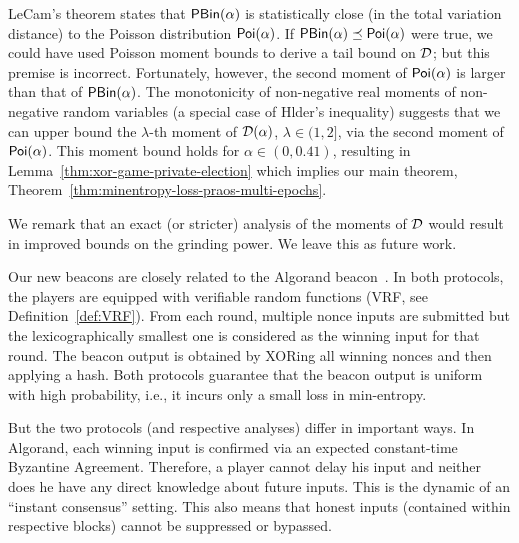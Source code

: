     LeCam's theorem states that $\mathsf{PBin}(\alpha)$ is 
    statistically close (in the total variation distance) 
    to the Poisson distribution $\mathsf{Poi}(\alpha)$. 
    If $\mathsf{PBin}(\alpha) \preceq \mathsf{Poi}(\alpha)$ were true, 
    we could have used Poisson moment bounds to 
    derive a tail bound on $\mathcal{D}$; 
    but this premise is incorrect. 
    Fortunately, however, 
    the second moment of $\mathsf{Poi}(\alpha)$ 
    is larger than that of $\mathsf{PBin}(\alpha)$.
    The monotonicity of non-negative real moments 
    of non-negative random variables
    (a special case of Hlder's inequality) 
    suggests that 
    we can upper bound the $\lambda$-th moment of $\mathcal{D}(\alpha)$, 
    $\lambda \in (1,2]$, via the second moment of $\mathsf{Poi}(\alpha)$. 
    This moment bound holds for $\alpha \in (0, 0.41)$, 
    resulting in Lemma~\ref{thm:xor-game-private-election} 
    which implies our main theorem, 
    Theorem~\ref{thm:minentropy-loss-praos-multi-epochs}.


    We remark that an exact (or stricter) analysis of 
    the moments of $\mathcal{D}$ 
    would result in improved bounds on the grinding power. 
    We leave this as future work.



        Our new beacons are closely related to the Algorand beacon~\cite{Algorand}. 
        In both protocols, 
        the players are equipped with verifiable
        random functions (VRF, see Definition~\ref{def:VRF}). 
        From each round, multiple nonce inputs are submitted 
        but the lexicographically smallest one is considered as the winning input for that round.
        The beacon output is obtained by XORing all winning nonces and then applying a hash. 
        Both protocols guarantee that the beacon output 
        is uniform with high probability, i.e., 
        it incurs only a small loss in min-entropy. 

        But the two protocols (and respective analyses) differ in important ways. 
        In Algorand, each winning input is confirmed via 
        an expected constant-time Byzantine Agreement. 
        Therefore, 
        a player cannot delay his input and neither does he have any direct knowledge 
        about future inputs. 
        This is the dynamic of an ``instant consensus'' setting. 
        This also means that honest inputs (contained within respective blocks) 
        cannot be suppressed or bypassed.

